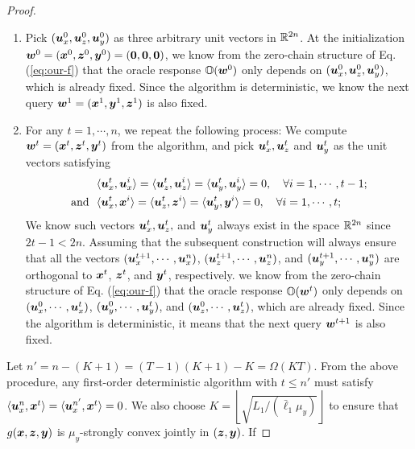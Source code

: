 \begin{proof}
\begin{enumerate}
    \item Pick $({\bm{u}}_x^0,{\bm{u}}_z^0,{\bm{u}}_y^0)$ as three arbitrary unit vectors in ${\mathbb{R}}^{2n}$. At the initialization ${\bm{w}}^0 = ({\bm{x}}^0,{\bm{z}}^0,{\bm{y}}^0) = ({\bm{0}}, {\bm{0}}, {\bm{0}})$, we know from the zero-chain structure of Eq. (\ref{eq:our-f}) that the oracle response ${\mathbb{O}}({\bm{w}}^0)$ only depends on $({\bm{u}}_x^0,{\bm{u}}_z^0,{\bm{u}}_y^0)$, which is already fixed. Since the algorithm is deterministic, we know the next query ${\bm{w}}^1 = ({\bm{x}}^1, {\bm{y}}^1, {\bm{z}}^1)$ is also fixed.
    \item For any $t =1, \cdots,n $, we repeat the following process: We compute ${\bm{w}}^t = ({\bm{x}}^t, {\bm{z}}^t, {\bm{y}}^t)$ from the algorithm, and pick ${\bm{u}}_x^t, {\bm{u}}_z^t$ and $ {\bm{u}}_y^t$ as the unit vectors satisfying 
    \begin{align*}
    &\langle {\bm{u}}_x^t, {\bm{u}}_x^i \rangle = \langle {\bm{u}}_z^t, {\bm{u}}_z^i \rangle = \langle {\bm{u}}_y^t, {\bm{u}}_y^i \rangle = 0,\quad \forall i = 1,\cdots,t-1; \\
    {\rm and} ~~ &\langle {\bm{u}}_x^t, {\bm{x}}^i \rangle = \langle {\bm{u}}_z^t, {\bm{z}}^i \rangle =  \langle {\bm{u}}_y^t, {\bm{y}}^i \rangle = 0,\quad \forall i = 1,\cdots,t; 
    \end{align*}
    We know such vectors ${\bm{u}}_x^t, {\bm{u}}_z^t,$ and ${\bm{u}}_y^t$ always exist in the space ${\mathbb{R}}^{2n}$ since $ 2t-1 < 2n$.
    Assuming that the subsequent construction will always ensure that all the vectors $({\bm{u}}^{t+1}_x, \cdots, {\bm{u}}^n_x)$, $({\bm{u}}^{t+1}_z, \cdots, {\bm{u}}^n_z)$, and $({\bm{u}}^{t+1}_y, \cdots, {\bm{u}}^n_y)$  are orthogonal to ${\bm{x}}^t$, ${\bm{z}}^t$, and ${\bm{y}}^t$, respectively. we know from the zero-chain structure of Eq. (\ref{eq:our-f}) that the oracle response ${\mathbb{O}}({\bm{w}}^t)$ only depends on $({\bm{u}}^0_x,\cdots, {\bm{u}}^t_x)$, $({\bm{u}}^0_y,\cdots, {\bm{u}}^t_y)$, and $({\bm{u}}^0_z,\cdots, {\bm{u}}^t_z)$, which are already fixed. Since the algorithm is deterministic, it means that the next query ${\bm{w}}^{t+1}$ is also fixed.
\end{enumerate}
Let $n' = n - (K+1) = (T-1)(K+1) - K = \Omega(KT )$.
From the above procedure, any first-order deterministic algorithm with $t \le n'$ must satisfy $\langle {\bm{u}}_x^n, {\bm{x}}^t \rangle = \langle {\bm{u}}_x^{n'}, {\bm{x}}^{t} \rangle = 0$.
We also choose  $ K =  \left \lfloor \sqrt{{L_1}/{(\bar \ell_1 \mu_y)}} \right \rfloor$ 
to ensure that $g({\bm{x}},{\bm{z}},{\bm{y}})$ is $\mu_y$-strongly convex jointly in $({\bm{z}},{\bm{y}})$. If 

\end{proof}
